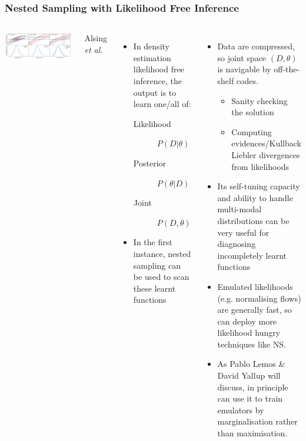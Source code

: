 \documentclass[aspectratio=169]{beamer}
\begin{document}
\begin{frame}
    \frametitle{Nested Sampling with Likelihood Free Inference}
    \begin{columns}
        \includegraphics[width=\textwidth]{figures/three_ways_II.pdf}

        \hfill Alsing \textit{et al.}~
    \begin{itemize}
        \item In density estimation likelihood free inference, the output is to learn one/all of:
            \begin{description}
                \item[Likelihood] $P(D|\theta)$
                \item[Posterior] $P(\theta|D)$ 
                \item[Joint] $P(D,\theta)$
            \end{description}
        \item In the first instance, nested sampling can be used to scan these learnt functions
    \end{itemize}
    \begin{itemize}
        \item Data are compressed, so joint space $(D,\theta)$ is navigable by off-the-shelf codes. 
            \begin{itemize}
                \item Sanity checking the solution
                \item Computing evidences/Kullback Liebler divergences from likelihoods
            \end{itemize}
        \item Its self-tuning capacity and ability to handle multi-modal distributions can be very useful for diagnosing incompletely learnt functions
        \item Emulated likelihoods (e.g. normalising flows) are generally fast, so can deploy more likelihood hungry techniques like NS.
        \item As Pablo Lemos \& David Yallup will discuss, in principle can use it to train emulators by marginalisation rather than maximisation.
    \end{itemize}
    \end{columns}
\end{frame}
\end{document}
